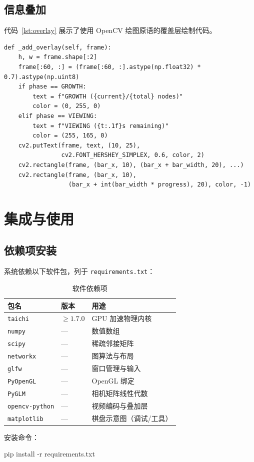 \documentclass[11pt,a4paper]{report}
\begin{document}
\section{信息叠加}
\label{sec:overlay}
代码~\ref{lst:overlay} 展示了使用 OpenCV 绘图原语的覆盖层绘制代码。
\begin{lstlisting}[style=pythonstyle,
                   caption=含进度条的信息叠加层渲染,
                   label=lst:overlay]
def _add_overlay(self, frame):
    h, w = frame.shape[:2]
    frame[:60, :] = (frame[:60, :].astype(np.float32) * 0.7).astype(np.uint8)
    if phase == GROWTH:
        text = f"GROWTH ({current}/{total} nodes)"
        color = (0, 255, 0)
    elif phase == VIEWING:
        text = f"VIEWING ({t:.1f}s remaining)"
        color = (255, 165, 0)
    cv2.putText(frame, text, (10, 25),
                cv2.FONT_HERSHEY_SIMPLEX, 0.6, color, 2)
    cv2.rectangle(frame, (bar_x, 10), (bar_x + bar_width, 20), ...)
    cv2.rectangle(frame, (bar_x, 10),
                  (bar_x + int(bar_width * progress), 20), color, -1)
\end{lstlisting}
\chapter{集成与使用}
\label{ch:usage}
\section{依赖项安装}
\label{sec:install}
系统依赖以下软件包，列于 \texttt{requirements.txt}：
\begin{table}[htbp]
\centering
\caption{软件依赖项}
\label{tab:deps}
\begin{tabular}{lll}
\toprule
\textbf{包名} & \textbf{版本} & \textbf{用途} \\
\midrule
\texttt{taichi}   & $\ge 1.7.0$ & GPU 加速物理内核 \\
\texttt{numpy}    & ---          & 数值数组 \\
\texttt{scipy}    & ---          & 稀疏邻接矩阵 \\
\texttt{networkx} & ---          & 图算法与布局 \\
\texttt{glfw}     & ---          & 窗口管理与输入 \\
\texttt{PyOpenGL} & ---          & OpenGL 绑定 \\
\texttt{PyGLM}    & ---          & 相机矩阵线性代数 \\
\texttt{opencv-python} & ---    & 视频编码与叠加层 \\
\texttt{matplotlib} & ---       & 棋盘示意图（调试/工具）\\
\bottomrule
\end{tabular}
\end{table}
安装命令：
\begin{pythoncode}
pip install -r requirements.txt
\end{pythoncode}
\end{document}
